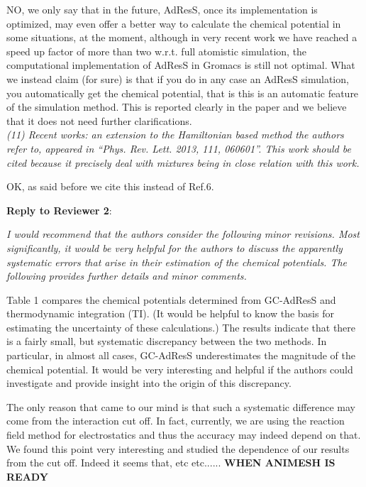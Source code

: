 \documentclass[12pt]{article}
\begin{document}
NO, we only say that in the future, AdResS, once its implementation is optimized, may even offer a better way to calculate the chemical potential in some situations, at the moment, although in very recent work we have reached a speed up factor of more than two w.r.t. full atomistic simulation, the computational implementation of AdResS in Gromacs is still not optimal. What we instead claim (for sure) is that if you do in any case an AdResS simulation, you automatically get the chemical potential, that is this is an automatic feature of the simulation method. This is reported clearly in the paper and we believe that it does not need further clarifications.\\

{\it (11) Recent works: an extension to the Hamiltonian based method the authors refer to, appeared in ``Phys. Rev. Lett. 2013, 111, 060601''. This work should be cited because it precisely deal with mixtures being in close relation with this work.}

OK, as said before we cite this instead of Ref.6.



{\bf Reply to Reviewer 2}:\\

 {\it I would recommend that the authors consider the following minor revisions. Most significantly, it would be very helpful for the authors to discuss the apparently systematic errors that arise in their estimation of the chemical potentials. The following provides further details and minor comments.

Table 1 compares the chemical potentials determined from GC-AdResS and thermodynamic integration (TI). (It would be helpful to know the basis for estimating the uncertainty of these calculations.) The results indicate that there is a fairly small, but systematic discrepancy between the two methods. In particular, in almost all cases, GC-AdResS underestimates the magnitude of the chemical potential. It would be very interesting and helpful if the authors could investigate and provide insight into the origin of this discrepancy.}

The only reason that came to our mind is that such a systematic difference may come from the interaction cut off.
In fact, currently, we are using the reaction field method for electrostatics and thus the accuracy may indeed depend on that.\\
We found this point very interesting and studied the dependence of our results from the cut off. Indeed it seems that, etc etc...... {\bf WHEN ANIMESH IS READY}\\
\end{document}
